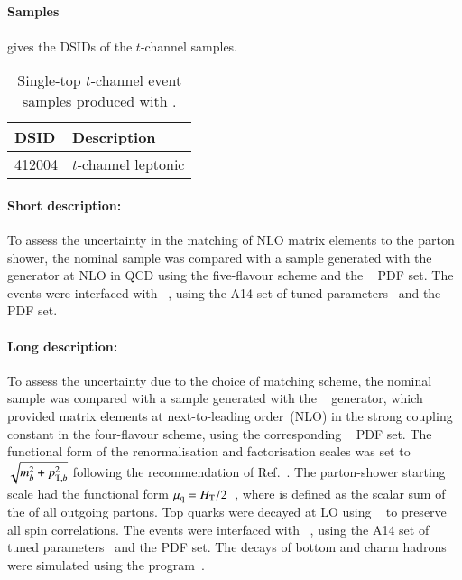 \subsection[MadGraph5\_aMC@NLO+Pythia8]{\MGNLOPY[8]}
\label{subsubsec:tchan_aMCP8}

\paragraph{Samples}

 gives the DSIDs of the \(t\)-channel \MGNLOPY[8] samples.

\begin{table}[htbp]
  \caption{Single-top \(t\)-channel event samples produced with \MGNLOPY[8].}%
  \label{tab:tchan_aMCP8}
  \centering
  \begin{tabular}{l l}
    \toprule
    DSID & Description \\
    \midrule
    412004 & \(t\)-channel leptonic \\
    \bottomrule
  \end{tabular}
\end{table}

\paragraph{Short description:}

To assess the uncertainty in the matching of NLO matrix elements to the
parton shower, the nominal sample was compared with a sample generated
with the \MGNLO[2.6.2]~\cite{Alwall:2014hca} generator at NLO in QCD using the five-flavour
scheme and the \NNPDF[2.3nlo]~\cite{Ball:2014uwa} PDF set. The events were
interfaced with \PYTHIA[8.230]~\cite{Sjostrand:2014zea}, using the A14
set of tuned parameters~\cite{ATL-PHYS-PUB-2014-021} and the \NNPDF[2.3lo] PDF set.


\paragraph{Long description:}

To assess the uncertainty due to the choice of matching scheme, the nominal sample was compared with a sample generated
with the \MGNLO[2.6.2]~\cite{Alwall:2014hca} generator, which provided matrix elements at next-to-leading order~(NLO) in the strong coupling constant \alphas
in the four-flavour scheme, using the corresponding \NNPDF[3.0nlo]~\cite{Ball:2014uwa} PDF set.
The functional form of the renormalisation and factorisation scales was set to \(\sqrt{m_b^2 + \pTX[2][b]}\)
following the recommendation of Ref.~\cite{Frederix:2012dh}.
The parton-shower starting scale had the functional form \(\mu_\mathrm{q} = H_{\text{T}}/2\)~\cite{ATL-PHYS-PUB-2017-007},
where \HT is defined as the scalar sum of the \pT of all outgoing partons.
Top quarks were decayed at LO using \MADSPIN~\cite{Frixione:2007zp,Artoisenet:2012st} to preserve all spin correlations.
The events were interfaced with \PYTHIA[8.230]~\cite{Sjostrand:2014zea}, using the A14 set of tuned parameters~\cite{ATL-PHYS-PUB-2014-021}
and the \NNPDF[2.3lo] PDF set.
The decays of bottom and charm hadrons were simulated using the \EVTGEN[1.6.0] program~\cite{Lange:2001uf}.



